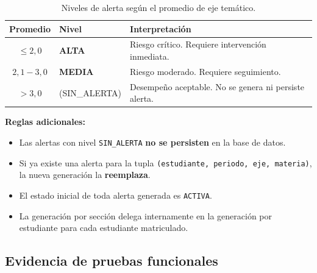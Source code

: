 \documentclass[11pt,a4paper,oneside]{article}
\newcommand{\code}[1]{\texttt{\small #1}}
\begin{document}
\begin{table}[h]
\centering\renewcommand{\arraystretch}{1.2}\small
\begin{tabular}{@{}c l p{8.3cm}@{}}
\toprule
\textbf{Promedio} & \textbf{Nivel} & \textbf{Interpretación} \\
\midrule
$\leq 2{,}0$         & {\color{ataraRojo}\textbf{ALTA}}        & Riesgo crítico. Requiere intervención inmediata. \\
$2{,}1 - 3{,}0$      & {\color{ataraNaranja}\textbf{MEDIA}}    & Riesgo moderado. Requiere seguimiento. \\
$> 3{,}0$            & (SIN\_ALERTA)                           & Desempeño aceptable. No se genera ni persiste alerta. \\
\bottomrule
\end{tabular}
\caption{Niveles de alerta según el promedio de eje temático.}
\end{table}

\textbf{Reglas adicionales:}

\begin{itemize}[leftmargin=*]
  \item Las alertas con nivel \code{SIN\_ALERTA} \textbf{no se persisten} en la base de datos.
  \item Si ya existe una alerta para la tupla \code{(estudiante, periodo, eje, materia)}, la
        nueva generación la \textbf{reemplaza}.
  \item El estado inicial de toda alerta generada es \code{ACTIVA}.
  \item La generación por sección delega internamente en la generación por estudiante para
        cada estudiante matriculado.
\end{itemize}

\subsection{Evidencia de pruebas funcionales}
\end{document}
